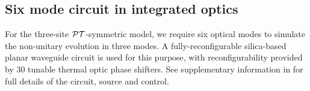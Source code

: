 \subsection{Six mode circuit in integrated optics}
For the three-site \(\mathcal{PT}\)-symmetric model, we require six optical modes to
simulate the non-unitary evolution in three modes. A fully-reconfigurable
silica-based planar waveguide circuit is used for this purpose, with
reconfigurability provided by 30 tunable thermal optic phase shifters. See
supplementary information in \cite{bigreck} for full details of the circuit,
source and control.



